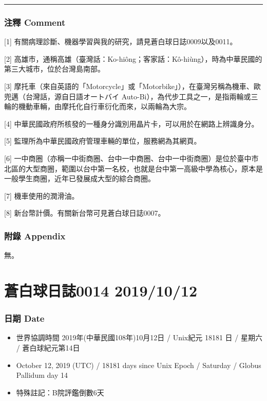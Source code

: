 \documentclass[
]{article}
\providecommand{\tightlist}{%
  \setlength{\itemsep}{0pt}\setlength{\parskip}{0pt}}
\begin{document}
\begin{center}\rule{0.5\linewidth}{\linethickness}\end{center}

\hypertarget{ux6ce8ux91cb-comment-6}{%
\subsubsection{注釋 Comment}\label{ux6ce8ux91cb-comment-6}}

{[}1{]} 有關病理診斷、機器學習與我的研究，請見蒼白球日誌0009以及0011。

{[}2{]}
高雄市，通稱高雄（臺灣話：Ko-hiông；客家話：Kô-hiùng），時為中華民國的第三大城市，位於台灣島南部。

{[}3{]}
摩托車（來自英語的「Motorcycle」或「Motorbike」），在臺灣另稱為機車、歐兜邁（台灣話，源自日語オートバイ
Auto-Bi），為代步工具之一，是指兩輪或三輪的機動車輛，由摩托化自行車衍化而來，以兩輪為大宗。

{[}4{]}
中華民國政府所核發的一種身分識別用晶片卡，可以用於在網路上辨識身分。

{[}5{]} 監理所為中華民國政府管理車輛的單位，服務網為其網頁。

{[}6{]}
一中商圈（亦稱一中街商圈、台中一中商圈、台中一中街商圈）是位於臺中市北區的大型商圈，範圍以台中第一名校，也就是台中第一高級中學為核心，原本是一般學生商圈，近年已發展成大型的綜合商圈。

{[}7{]} 機車使用的潤滑油。

{[}8{]} 新台幣計價。有關新台幣可見蒼白球日誌0007。

\hypertarget{ux9644ux9304-appendix-5}{%
\subsubsection{附錄 Appendix}\label{ux9644ux9304-appendix-5}}

無。

\hypertarget{ux84bcux767dux7403ux65e5ux8a8c0014-20191012}{%
\section{蒼白球日誌0014
2019/10/12}\label{ux84bcux767dux7403ux65e5ux8a8c0014-20191012}}

\hypertarget{ux65e5ux671f-date-13}{%
\subsubsection{日期 Date}\label{ux65e5ux671f-date-13}}

\begin{itemize}
\tightlist
\item
  世界協調時間 2019年(中華民國108年)10月12日 / Unix紀元 18181 日 /
  星期六 / 蒼白球紀元第14日
\item
  October 12, 2019 (UTC) / 18181 days since Unix Epoch / Saturday /
  Globus Pallidum day 14
\item
  特殊註記：B院評鑑倒數6天
\end{itemize}
\end{document}
